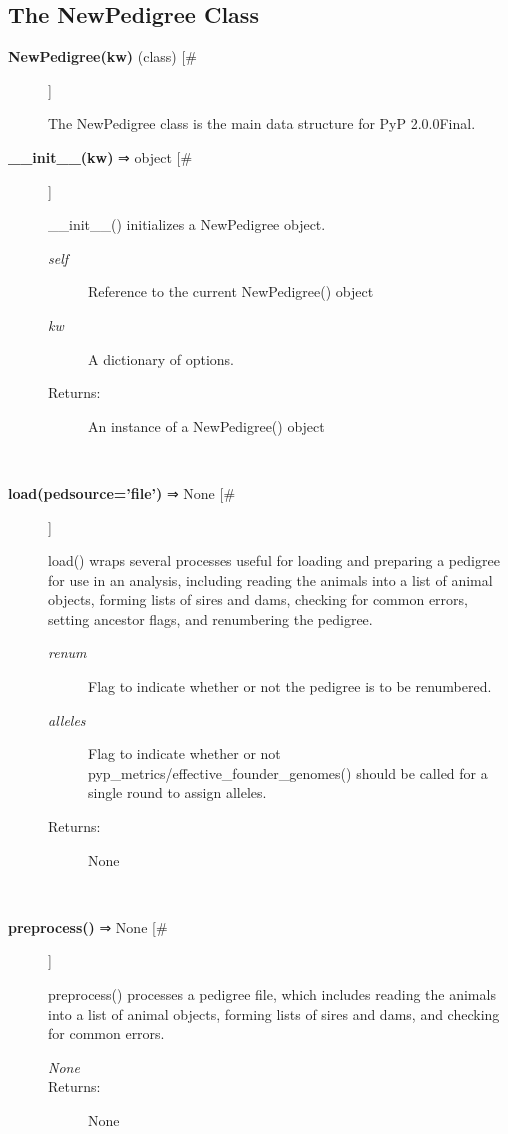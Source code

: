 \subsection*{The NewPedigree Class}
\begin{description}
\item[\textbf{NewPedigree(kw)}
 (class) [\#]]

 The NewPedigree class is the main data structure for PyP 2.0.0Final.

\item[\textbf{\_\_init\_\_(kw)}
 ⇒ object [\#]]

 \_\_init\_\_() initializes a NewPedigree object.
\begin{description}
\item[\emph{self}
] Reference to the current NewPedigree() object
\item[\emph{kw}
] A dictionary of options.
\item[Returns:] An instance of a NewPedigree() object

\end{description}
\\ 

\item[\textbf{load(pedsource='file')}
 ⇒ None [\#]]

 load() wraps several processes useful for loading and preparing a pedigree for use in an analysis, including reading the animals into a list of animal objects, forming lists of sires and dams, checking for common errors, setting ancestor flags, and renumbering the pedigree.
\begin{description}
\item[\emph{renum}
] Flag to indicate whether or not the pedigree is to be renumbered.
\item[\emph{alleles}
] Flag to indicate whether or not pyp\_metrics/effective\_founder\_genomes() should be called for a single round to assign alleles.
\item[Returns:] None

\end{description}
\\ 

\item[\textbf{preprocess()}
 ⇒ None [\#]]

 preprocess() processes a pedigree file, which includes reading the animals into a list of animal objects, forming lists of sires and dams, and checking for common errors.
\begin{description}
\item[\emph{None}
]
\item[Returns:] None


\end{description}
\end{description}
